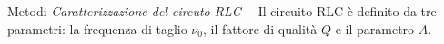 \documentclass[
    rmp,
    reprint, 
    superscriptaddress, 
    altaffilletter, 
    amsmath, 
    amssymb, 
    a4paper]{revtex4-2}
\begin{document}
\begin{methods}{Metodi}
    \textit{Caratterizzazione del circuto RLC---} Il circuito RLC è definito da tre parametri: la frequenza di taglio $\nu_0$, il fattore di qualità $Q$ e il parametro $A$. 
    
\end{methods}


\appendix

\setcounter{table}{0}
\renewcommand{\thetable}{A-\Roman{table}}
\end{document}
